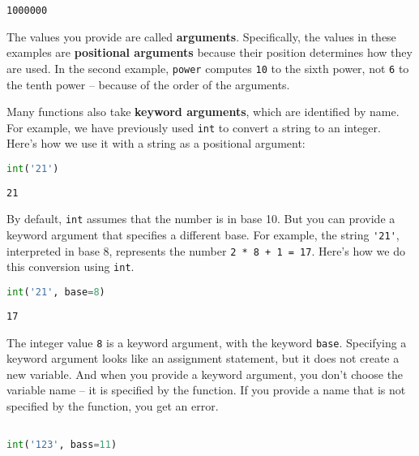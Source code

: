 \begin{lstlisting}[style=output]
1000000
\end{lstlisting}

The values you provide are called \textbf{arguments}. Specifically, the
values in these examples are \textbf{positional arguments} because their
position determines how they are used. In the second example,
\passthrough{\lstinline!power!} computes \passthrough{\lstinline!10!} to
the sixth power, not \passthrough{\lstinline!6!} to the tenth power --
because of the order of the arguments.

Many functions also take \textbf{keyword arguments}, which are
identified by name. For example, we have previously used
\passthrough{\lstinline!int!} to convert a string to an integer. Here's
how we use it with a string as a positional argument:

\begin{lstlisting}[language=Python,style=source]
int('21')
\end{lstlisting}

\begin{lstlisting}[style=output]
21
\end{lstlisting}

By default, \passthrough{\lstinline!int!} assumes that the number is in
base 10. But you can provide a keyword argument that specifies a
different base. For example, the string \passthrough{\lstinline!'21'!},
interpreted in base 8, represents the number
\passthrough{\lstinline!2 * 8 + 1 = 17!}. Here's how we do this
conversion using \passthrough{\lstinline!int!}.

\begin{lstlisting}[language=Python,style=source]
int('21', base=8)
\end{lstlisting}

\begin{lstlisting}[style=output]
17
\end{lstlisting}

The integer value \passthrough{\lstinline!8!} is a keyword argument,
with the keyword \passthrough{\lstinline!base!}. Specifying a keyword
argument looks like an assignment statement, but it does not create a
new variable. And when you provide a keyword argument, you don't choose
the variable name -- it is specified by the function. If you provide a
name that is not specified by the function, you get an error.

\begin{lstlisting}[language=Python,style=source]
%%expect TypeError

int('123', bass=11)
\end{lstlisting}

